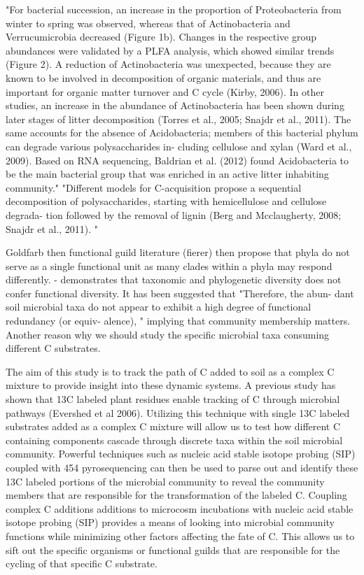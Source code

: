 "For bacterial succession, an increase in the proportion of Proteobacteria from winter to spring was observed, whereas that of Actinobacteria and Verrucumicrobia decreased (Figure 1b). Changes in the respective group abundances were validated by a PLFA analysis, which showed similar trends (Figure 2). A reduction of Actinobacteria was unexpected, because they are known to be involved in decomposition of organic materials, and thus are important for organic matter turnover and C cycle (Kirby, 2006). In other studies, an increase in the abundance of Actinobacteria has been shown during later stages of litter decomposition (Torres et al., 2005; Snajdr et al., 2011). The same accounts for the absence of Acidobacteria; members of this bacterial phylum can degrade various polysaccharides in- cluding cellulose and xylan (Ward et al., 2009). Based on RNA sequencing, Baldrian et al. (2012) found Acidobacteria to be the main bacterial group that was enriched in an active litter inhabiting community." 
"Different models for C-acquisition propose a sequential decomposition of polysaccharides, starting with hemicellulose and cellulose degrada- tion followed by the removal of lignin (Berg and Mcclaugherty, 2008; Snajdr et al., 2011). " \cite{Schneider_2012}  



Goldfarb then functional guild literature (fierer) then propose that phyla do not serve as a single functional unit as many clades within a phyla may respond differently.    
\cite{Fierer_2012} - demonstrates that taxonomic and phylogenetic diversity does not confer functional diversity.  
It has been suggested that "Therefore, the abun- dant soil microbial taxa do not appear to exhibit a high degree of functional redundancy (or equiv- alence), "\cite{Fierer_2013} implying that community membership matters.  Another reason why we should study the specific microbial taxa consuming different C substrates.  

The aim of this study is to track the path of C added to soil as a complex C mixture to provide insight into these dynamic systems.  A previous study has shown that 13C labeled plant residues enable tracking of C through microbial pathways (Evershed et al 2006).  Utilizing this technique with single 13C labeled substrates added as a complex C mixture will allow us to test how different C containing components cascade through discrete taxa within the soil microbial community. Powerful techniques such as nucleic acid stable isotope probing (SIP) coupled with 454 pyrosequencing can then be used to parse out and identify these 13C labeled portions of the microbial community to reveal the community members that are responsible for the transformation of the labeled C. Coupling complex C additions additions to microcosm incubations with nucleic acid stable isotope probing (SIP) provides a means of looking into microbial community functions while minimizing other factors affecting the fate of C.  This allows us to sift out the specific organisms or functional guilds that are responsible for the cycling of that specific C substrate.  




